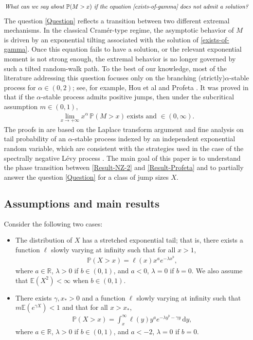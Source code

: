 \documentclass[11pt]{article}
\numberwithin{equation}{section}
\begin{document}
\begin{align}\label{Question}
	\emph{What can we say about $\mathbb{P}(M > x)$ if the equation \eqref{exists-of-gamma} does not admit a solution?}
\end{align}
The question \eqref{Question} reflects a transition between two different extremal mechanisms. In the classical Cramér-type regime, the asymptotic behavior of $M$ is driven by an exponential tilting associated with the solution of \eqref{exists-of-gamma}. Once this equation fails to have a solution, or the relevant exponential moment is not strong enough, the extremal behavior is no longer governed by such a tilted random-walk path. 
To the best of our knowledge, most of the literature addressing this question focuses only on the branching (strictly)$\alpha$-stable process for $\alpha \in (0,2)$; see, for example, Hou et al \cite{HJRS25} and Profeta \cite{profeta22alea}. It was proved in \cite{HJRS25, profeta22alea} that if the $\alpha$-stable process admits positive jumps, then under the subcritical assumption $m\in (0,1)$,
\begin{align}\label{Result-Profeta}
	\lim_{x \to +\infty} x^\alpha \, \mathbb{P}(M > x)\ \mbox{exists and } \in (0,\infty).
\end{align}
 The proofs in \cite{HJRS25, profeta22alea} are based on the Laplace transform argument and fine analysis on tail probability of an $\alpha$-stable process indexed by an independent exponential random variable, which are consistent with the strategies used in the case of the spectrally negative L\'evy process \cite{profeta24bernoulli}. The main goal of this paper is to understand the phase transition between \eqref{Result-NZ-2} and \eqref{Result-Profeta} and to partially answer the question \eqref{Question} for a class of jump sizes $X$. 


\subsection{Assumptions and main results}
Consider the following two cases:
\begin{itemize}
	\item [{\bf(H1)}] The distribution of $X$ has a stretched exponential tail; that is, there exists a function $\ell$ slowly varying at infinity such that for all $x > 1$, 
	\begin{align}\label{Tail-of-X}
		\mathbb{P}(X > x) = \ell(x) x^a e^{-\lambda x^b},
	\end{align}
	where $a \in \mathbb{R}$, $\lambda > 0$ if $b \in (0,1)$, and $a < 0$, $\lambda = 0$ if $b = 0$. We also assume that $\mathbb{E}(X^2) < \infty$ when $b \in (0,1)$. 
	
	\item [{\bf(H2)}] There exists $\gamma, x_* > 0$ and a function $\ell$ slowly varying at infinity such that $m \mathbb{E}(e^{\gamma X}) < 1$  and that for all $x > x_*$, 
	\begin{align}
		\mathbb{P}(X > x) = \int_x^\infty \ell(y) y^a e^{-\lambda y^b - \gamma y} \, \mathrm{d}y, 
	\end{align}
	where $a \in \mathbb{R}$, $\lambda > 0$ if $b \in (0,1)$, and $a < -2$, $\lambda = 0$ if $b = 0$.
\end{itemize}
\end{document}
